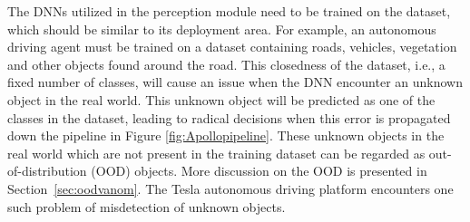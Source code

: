 The DNNs utilized in the perception module need to be trained on the dataset, which should be similar to its deployment area.
For example, an autonomous driving agent must be trained on a dataset containing roads, vehicles, vegetation and other objects found around the road.
This closedness of the dataset, i.e., a fixed number of classes, will cause an issue when the DNN encounter an unknown object in the real world.
This unknown object will be predicted as one of the classes in the dataset, leading to radical decisions when this error is propagated down the pipeline in Figure \ref{fig:Apollopipeline}.
These unknown objects in the real world which are not present in the training dataset can be regarded as out-of-distribution (OOD) objects. 
More discussion on the OOD is presented in Section~\ref{sec:oodvanom}.
The Tesla autonomous driving platform encounters one such problem of misdetection of unknown objects.
